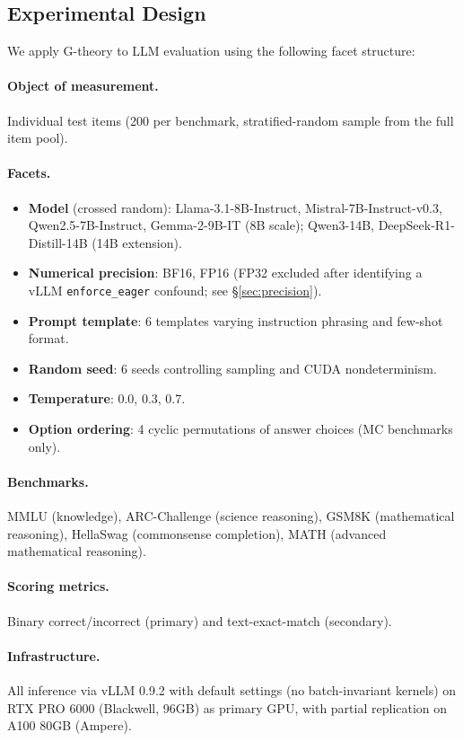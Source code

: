 \documentclass[11pt,letterpaper]{article}
\begin{document}
\subsection{Experimental Design}

We apply G-theory to LLM evaluation using the following facet structure:

\paragraph{Object of measurement.} Individual test items (200 per benchmark, stratified-random sample from the full item pool).

\paragraph{Facets.}
\begin{itemize}
\item \textbf{Model} (crossed random): Llama-3.1-8B-Instruct, Mistral-7B-Instruct-v0.3, Qwen2.5-7B-Instruct, Gemma-2-9B-IT (8B scale); Qwen3-14B, DeepSeek-R1-Distill-14B (14B extension).
\item \textbf{Numerical precision}: BF16, FP16 (FP32 excluded after identifying a vLLM \texttt{enforce\_eager} confound; see \S\ref{sec:precision}).
\item \textbf{Prompt template}: 6 templates varying instruction phrasing and few-shot format.
\item \textbf{Random seed}: 6 seeds controlling sampling and CUDA nondeterminism.
\item \textbf{Temperature}: 0.0, 0.3, 0.7.
\item \textbf{Option ordering}: 4 cyclic permutations of answer choices (MC benchmarks only).
\end{itemize}

\paragraph{Benchmarks.} MMLU (knowledge), ARC-Challenge (science reasoning), GSM8K (mathematical reasoning), HellaSwag (commonsense completion), MATH (advanced mathematical reasoning).

\paragraph{Scoring metrics.} Binary correct/incorrect (primary) and text-exact-match (secondary).

\paragraph{Infrastructure.} All inference via vLLM 0.9.2 with default settings (no batch-invariant kernels) on RTX PRO 6000 (Blackwell, 96GB) as primary GPU, with partial replication on A100 80GB (Ampere).
\end{document}
